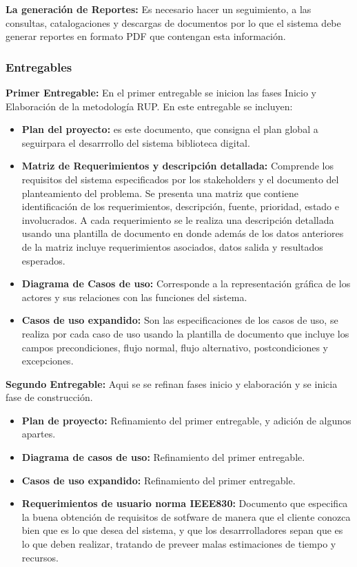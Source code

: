 \documentclass[]{article}
\begin{document}
	\textbf{La generación de Reportes:} Es necesario hacer un seguimiento, a las consultas,
	catalogaciones y descargas de documentos por lo que el sistema debe generar reportes en formato
	PDF que contengan esta información.
	
		\subsubsection{Entregables}
		\textbf{Primer Entregable:} En el primer entregable se inicion las fases Inicio y Elaboración
		de la metodología RUP. En este entregable se incluyen:
		
		\begin{itemize}
		\item\textbf{Plan del proyecto:} es este documento, que consigna el plan global a
		seguirpara el desarrrollo del sistema biblioteca digital.

		\item\textbf{Matriz de Requerimientos y descripción detallada:} Comprende los requisitos
		del sistema especificados por los stakeholders y el documento del planteamiento del problema.
		Se presenta una matriz que contiene identificación de los requerimientos, descripción,
		fuente, prioridad, estado e involucrados. A cada requerimiento se le realiza una descripción
		detallada usando una plantilla de documento en donde además de los datos anteriores de la
		matriz incluye requerimientos asociados, datos salida y resultados esperados. 

		\item\textbf{Diagrama de Casos de uso:} Corresponde a la representación gráfica de los
		actores y sus relaciones con las funciones del sistema.

		\item\textbf{Casos de uso expandido:} Son las especificaciones de los casos de uso, se
		realiza por cada caso de uso usando la plantilla de documento que incluye los campos
		precondiciones, flujo normal, flujo alternativo, postcondiciones y excepciones.
		\end{itemize}

		\textbf{Segundo Entregable:} Aqui se se refinan fases inicio y elaboración y se inicia fase
		de construcción.
		
		\begin{itemize}
		\item\textbf{Plan de proyecto:} Refinamiento del primer entregable, y adición de algunos
		apartes.

		\item\textbf{Diagrama de casos de uso:} Refinamiento del primer entregable.

		\item\textbf{Casos de uso expandido:} Refinamiento del primer entregable. 

		\item\textbf{Requerimientos de usuario norma IEEE830:} Documento que especifica la buena
		obtención de requisitos de sotfware de manera que el cliente conozca bien que es lo que desea
		del sistema, y que los desarrrolladores sepan que es lo que deben realizar, tratando de
		preveer malas estimaciones de tiempo y recursos. 
		\end{itemize}
		
\end{document}
